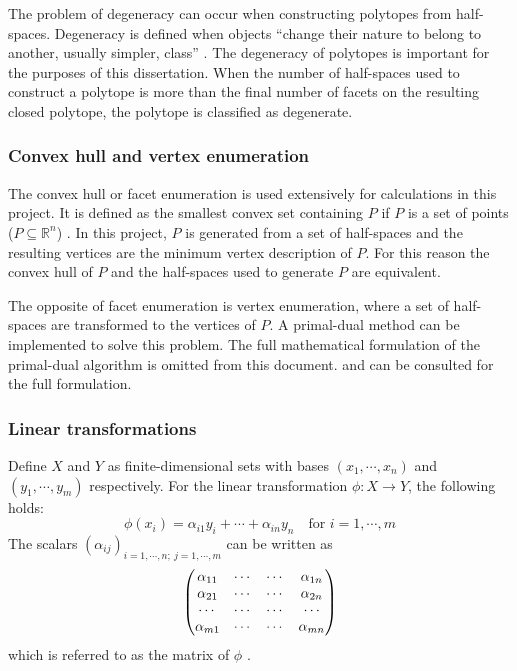 The problem of degeneracy can occur when constructing polytopes from half-spaces.
Degeneracy is defined when objects ``change their nature to belong to another, usually simpler, class'' \citep[688]{crcmaths}.
The degeneracy of polytopes is important for the purposes of this dissertation.
When the number of half-spaces used to construct a polytope is more than the final number of facets on the resulting closed polytope, the polytope is classified as degenerate.

\subsubsection{Convex hull and vertex enumeration}
The convex hull or facet enumeration is used extensively for calculations in this project.
It is defined as the smallest convex set containing $P$ if $P$ is a set of points ($P \subseteq \mathbb{R}^n$) \citep[74]{wenger}.
In this project, $P$ is generated from a set of half-spaces and the resulting vertices are the minimum vertex description of $P$.
For this reason the convex hull of $P$ and the half-spaces used to generate $P$ are equivalent.

The opposite of facet enumeration is vertex enumeration, where a set of half-spaces are transformed to the vertices of $P$.
A primal-dual method can be implemented to solve this problem.
The full mathematical formulation of the primal-dual algorithm is omitted from this document.
\citet[636-639]{primaldual1} and \citet{primaldual2} can be consulted for the full formulation. 

\subsubsection{Linear transformations}
Define $X$ and $Y$ as finite-dimensional sets with bases $(x_1,\cdots,x_n)$ and $(y_1,\cdots,y_m)$ respectively.
For the linear transformation $\phi : X \to Y$, the following holds:
\begin{equation}
  \label{eq:lintrans}
  \phi(x_i) = \alpha_{i1}y_i+\cdots+\alpha_{in}y_n \text{~~~for~} i = 1, \cdots, m
\end{equation}
The scalars $(\alpha_{ij})_{i=1,\cdots,n;~j=1,\cdots,m}$ can be written as
\begin{equation}
  \begin{pmatrix}
    \alpha_{11} &\cdots &\cdots &\alpha_{1n} \\
    \alpha_{21} &\cdots &\cdots &\alpha_{2n} \\
    \cdots     &\cdots &\cdots &\cdots \\
    \alpha_{m1} &\cdots &\cdots &\alpha_{mn} \\
  \end{pmatrix} \notag
\end{equation}
which is referred to as the matrix of $\phi$ \citep[48-49,~166]{leung}.

